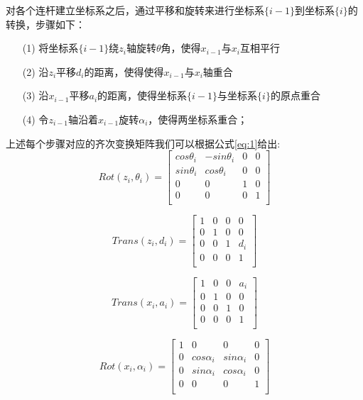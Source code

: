 \documentclass{seuthesis-2022}
\numberwithin{equation}{section}
\begin{document}
对各个连杆建立坐标系之后，通过平移和旋转来进行坐标系$\{i-1\}$到坐标系$\{i\}$的转换，步骤如下：

\begin{itemize}
  \item [(1)]
  将坐标系$\{i-1\}$绕$z_{i}$轴旋转$\theta$角，使得$x_{i-1}$与$x_{i}$互相平行
  \item [(2)]
  沿$z_{i}$平移$d_{i}$的距离，使得使得$x_{i-1}$与$x_{i}$轴重合
  \item [(3)]
  沿$x_{i-1}$平移$a_{i}$的距离，使得坐标系$\{i-1\}$与坐标系$\{i\}$的原点重合
  \item [(4)]
  令$z_{i-1}$轴沿着$x_{i-1}$旋转$\alpha_i$，使得两坐标系重合；
\end{itemize}

上述每个步骤对应的齐次变换矩阵我们可以根据公式\eqref{eq:1}给出:
\begin{equation}
  Rot(z_{i},\theta_{i})=
  \begin{bmatrix}
    cos\theta_{i} & -sin\theta_{i}& 0 & 0\\
    sin\theta_{i} & cos\theta_{i} & 0 & 0\\
    0 & 0 & 1 & 0\\
    0 & 0 & 0 & 1\\
  \end{bmatrix}
\end{equation}

\begin{equation}
  Trans(z_{i},d_{i})=
  \begin{bmatrix}
    1 & 0 & 0 & 0\\
    0 & 1 & 0 & 0\\
    0 & 0 & 1 & d_i\\
    0 & 0 & 0 & 1\\
  \end{bmatrix}
\end{equation}

\begin{equation}
  Trans(x_{i},a_{i})=
  \begin{bmatrix}
    1 & 0 & 0 & a_{i}\\
    0 & 1 & 0 & 0\\
    0 & 0 & 1 & 0\\
    0 & 0 & 0 & 1\\
  \end{bmatrix}
\end{equation}

\begin{equation}
  Rot(x_{i},\alpha_{i})=
  \begin{bmatrix}
    1 & 0 & 0 & 0\\
    0 & cos\alpha_{i} & sin\alpha_{i} & 0\\
    0 & sin\alpha_{i} & cos\alpha_{i} & 0\\
    0 & 0 & 0 & 1\\
  \end{bmatrix}
\end{equation}
\end{document}
